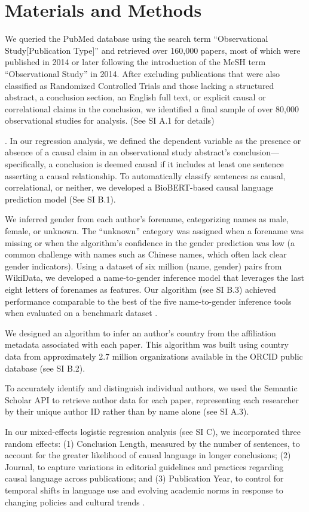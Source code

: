 \section{Materials and Methods}


We queried the PubMed database using the search term ``Observational
Study[Publication Type]'' and retrieved over 160,000 papers, most of which were
published in 2014 or later following the introduction of the MeSH term
``Observational Study'' in 2014. After excluding publications that were also classified as
Randomized Controlled Trials and those lacking a structured abstract, a
conclusion section, an English full text, or explicit causal or correlational
claims in the conclusion, we identified a final sample of over 80,000
observational studies for analysis. (See SI A.1 for details)


.
In our regression analysis, we defined the dependent variable as the presence or absence of a causal claim in
an observational study abstract's conclusion—specifically, a conclusion is deemed causal
if it includes at least one sentence asserting a causal relationship. To
automatically classify sentences as causal, correlational, or neither, we
developed a BioBERT-based causal language prediction model \citep{yu2019EMNLPCausalLanguage}
(See SI B.1).


We inferred gender from each author's forename, categorizing names as male,
female, or unknown. The ``unknown'' category was assigned when a forename was
missing or when the algorithm's confidence in the gender prediction was low (a
common challenge with names such as Chinese names, which often lack clear gender
indicators). Using a dataset of six million (name, gender) pairs from WikiData,
we developed a name-to-gender inference model that leverages the
last eight letters of forenames as features. Our algorithm (see SI B.3) achieved
performance comparable to the best of the five name-to-gender inference tools when
evaluated on a benchmark dataset \citep{Santamara2018ComparisonAB}.


We designed an algorithm to infer an author's country from the
affiliation metadata associated with each paper. This algorithm was built using
country data from approximately 2.7 million organizations available in the ORCID
public database (see SI B.2).

To accurately identify and distinguish individual authors, we used the Semantic
Scholar API to retrieve author data for each paper, representing each researcher
by their unique author ID rather than by name alone (see SI A.3).

In our mixed-effects logistic regression analysis (see SI C), we incorporated three random
effects: (1) Conclusion Length, measured by the number of sentences, to account
for the greater likelihood of causal language in longer conclusions; (2)
Journal, to capture variations in editorial guidelines and practices regarding
causal language across publications; and (3) Publication Year, to control for
temporal shifts in language use and evolving academic norms in response to
changing policies and cultural trends \cite{hyland2019}.
